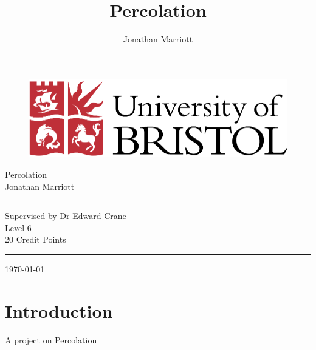 \documentclass[a4paper,11pt]{article}
\theoremstyle{definition}
\begin{document}
\thispagestyle{empty}

\begin{figure}[h]
\begin{center}
\includegraphics[scale=0.5]{uob.pdf} %
\end{center}
\end{figure}

\begin{center}
{\Large Percolation\\ \vspace{1cm}Jonathan Marriott}
\end{center}

\vspace{3cm}
\hrule
\begin{center}
Supervised by Dr Edward Crane\\
Level 6\\
20 Credit Points
\end{center}
\hrule

\vspace{3cm}
\begin{center}
\today
\end{center}
	
\title{Percolation}
\author{Jonathan Marriott}
\date{}
\maketitle


\tableofcontents{}


\section{Introduction}

A project on Percolation 
\end{document}

